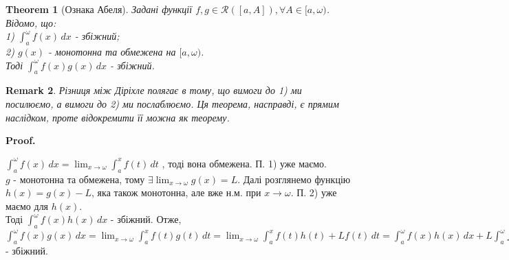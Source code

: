 \documentclass[a4paper, 10pt]{article}
\makeatletter
\def\huge{\displaystyle}
\def\qed{$\blacksquare$}
\theoremstyle{theoremdd}
\newtheorem{theorem}{Theorem}[subsection]
\theoremstyle{theoremdd}
\theoremstyle{theoremdd}
\theoremstyle{theoremdd}
\theoremstyle{theoremdd}
\theoremstyle{theoremdd}
\theoremstyle{theoremdd}
\newtheorem{remark}[theorem]{Remark}
\theoremstyle{theoremdd}
\theoremstyle{theoremdd}
\renewenvironment{proof}[1][Proof.\\]{\par
\pushQED{\hfill \qed}%
\normalfont \topsep6\p@\@plus6\p@\relax
\trivlist
\item\relax
{\bfseries
#1\@addpunct{.}}\hspace\labelsep\ignorespaces
}{%
\popQED\endtrivlist\@endpefalse
}
\makeatother
\begin{document}
\begin{theorem}[Ознака Абеля]
Задані функції $f,g \in \mathcal{R}([a,A]), \forall A \in [a,\omega)$. Відомо, що:\\
1) $\huge\int_a^\omega f(x)\,dx$ - збіжний;\\
2) $g(x)$ - монотонна та обмежена на $[a,\omega)$.\\
Тоді $\huge\int_a^\omega f(x)g(x)\,dx$ - збіжний.
\end{theorem}

\begin{remark}
Різниця між Діріхле полягає в тому, що вимоги до 1) ми посилюємо, а вимоги до 2) ми послаблюємо. Ця теорема, насправді, є прямим наслідком, проте відокремити її можна як теорему.
\end{remark}

\begin{proof}
$\huge\int_a^\omega f(x)\,dx = \huge\lim_{x \to \omega} \int_a^x f(t)\,dt$ , тоді вона обмежена. П. 1) уже маємо.\\
$g$ - монотонна та обмежена, тому $\exists \huge\lim_{x \to \omega} g(x) = L$. Далі розглянемо функцію $h(x) = g(x) - L$, яка також монотонна, але вже н.м. при $x \to \omega$. П. 2) уже маємо для $h(x)$.\\
Тоді $\huge\int_a^\omega f(x)h(x)\,dx$ - збіжний. Отже,\\
$\huge\int_a^\omega f(x)g(x)\,dx = \huge\lim_{x \to \omega} \int_a^x f(t)g(t)\,dt = \huge\lim_{x \to \omega} \int_a^x f(t)h(t)+Lf(t)\,dt = \int_a^\omega f(x)h(x)\,dx + L \int_a^\omega f(x)\,dx$ - збіжний.
\end{proof}
\end{document}
